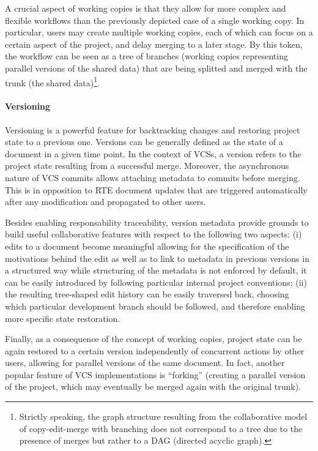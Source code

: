 \documentclass{sig-alternate}
\begin{document}
A crucial aspect of working copies is that they allow for more complex and flexible workflows
than the previously depicted case of a single working copy. In particular, users may create
multiple working copies, each of which can focus on a certain aspect of the project, and
delay merging to a later stage.
By this token, the workflow can be seen as a tree of branches (working copies
representing parallel versions of the shared data) that are being splitted and merged with
the trunk (the shared data)\footnote{
  Strictly speaking, the graph structure resulting from the collaborative model of copy-edit-merge
  with branching does not correspond to a tree due to the presence of merges but rather to a DAG
  (directed acyclic graph).
}.

\paragraph*{Versioning}
Versioning is a powerful feature for backtracking changes and restoring project state to a
previous one. Versions can be generally defined as the state of a document in a given time point.
In the context of VCSs, a version refers to the project state resulting from a successful merge.
Moreover, the asynchronous nature of VCS commits allows attaching metadata to commits before
merging. This is in opposition to RTE document updates that are triggered automatically
after any modification and propagated to other users.

Besides enabling responsability traceability, version metadata provide grounds to build useful
collaborative features with respect to the following two aspects: (i) edits to a document become
meaningful allowing for the specification of the motivations behind the edit as well as to link
to metadata in previous versions in a structured way \textemdash while structuring of the metadata
is not enforced by default, it can be easily introduced by following particular internal project
conventions; (ii) the resulting tree-shaped edit history can be easily traversed back, choosing
which particular development branch should be
followed, and therefore enabling more specific state restoration.

Finally, as a consequence of the concept of working copies, project state can be again restored
to a certain version independently of concurrent actions by other users, allowing for parallel
versions of the same document. In fact, another popular feature of VCS implementations
is ``forking'' (creating a parallel version of the project, which may eventually be merged
again with the original trunk).
\end{document}
